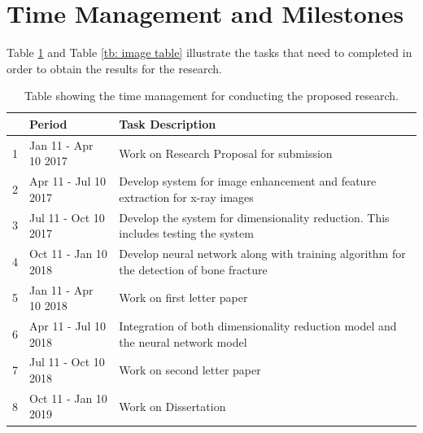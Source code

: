 \documentclass[11pt,twocolumn]{witseiepaper}
\begin{document}
	\section{Time Management and Milestones}
	\label{sc: Time Management and Milestones}
	Table \ref{time_management} and Table \ref{tb: image table} illustrate the tasks that need to completed in order to obtain the results for the research.
	\begin{table}[!h]
		\centering
		\caption{Table showing the time management for conducting the proposed research.}
		\label{time_management}
		\begin{tabular}{| c | p{2.5cm} | p{4.5cm} |}
			\hline
			& Period & Task Description \\
			\hline \hline
			1 & Jan 11 - Apr 10 2017 & Work on Research Proposal for submission\\
			\hline
			2 & Apr 11 - Jul 10 2017 & Develop system for image enhancement and feature extraction for x-ray images \\
			\hline
			3 & Jul 11 - Oct 10 2017 &  Develop the system for dimensionality reduction. This includes testing the system\\
			\hline
			4 & Oct 11 - Jan 10 2018 & Develop neural network along with training algorithm for the detection of bone fracture \\
			\hline
			5 & Jan 11 - Apr 10 2018 & Work on first letter paper \\
			\hline
			6 & Apr 11 - Jul 10 2018 & Integration of both dimensionality reduction model and the neural network model \\
			\hline
			7 & Jul 11 - Oct 10 2018 & Work on second letter paper\\
			\hline
			8 & Oct 11 - Jan 10 2019 & Work on Dissertation \\
			\hline
		\end{tabular}
	\end{table}
	
\end{document}
